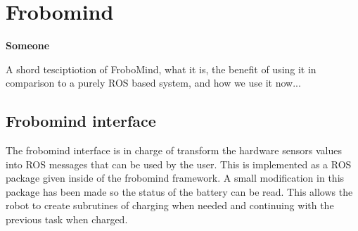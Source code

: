 \section{Frobomind} %
\label{sec:mr_frobomind}

\textbf{Someone}

A shord tesciptiotion of FroboMind, what it is, the benefit of using it in comparison to a purely ROS based system, and how we use it now...

	\subsection{Frobomind interface} %
	\label{sub:mr_frobomind_interface}
	The frobomind interface is in charge of transform the hardware sensors values into ROS messages that can be used by the user.
	This is implemented as a ROS package given inside of the frobomind framework.
	A small modification in this package has been made so the status of the battery can be read.
	This allows the robot to create subrutines of charging when needed and continuing with the previous task when charged.

